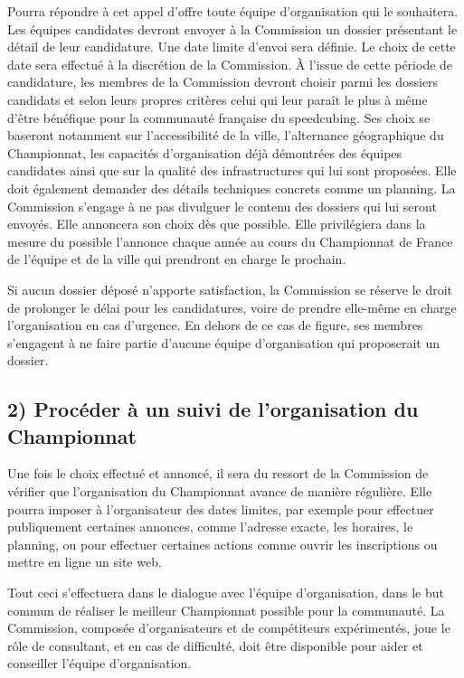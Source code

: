 \documentclass[a4paper,12pt]{scrartcl}
\begin{document}
Pourra répondre à cet appel d'offre toute équipe d'organisation qui le souhaitera. Les équipes candidates devront envoyer à la Commission un dossier présentant le détail de leur candidature. Une date limite d'envoi sera définie. Le choix de cette date sera effectué à la discrétion de la Commission. À l'issue de cette période de candidature, les membres de la Commission devront choisir parmi les dossiers candidats et selon leurs propres critères celui qui leur paraît le plus à même d'être bénéfique pour la communauté française du speedcubing. Ses choix se baseront notamment sur l'accessibilité de la ville, l'alternance géographique du Championnat, les capacités d'organisation déjà démontrées des équipes candidates ainsi que sur la qualité des infrastructures qui lui sont proposées. Elle doit également demander des détails techniques concrets comme un planning. La Commission s'engage à ne pas divulguer le contenu des dossiers qui lui seront envoyés. Elle annoncera son choix dès que possible. Elle privilégiera dans la mesure du possible l'annonce chaque année au cours du Championnat de France de l'équipe et de la ville qui prendront en charge le prochain.

Si aucun dossier déposé n'apporte satisfaction, la Commission se réserve le droit de prolonger le délai pour les candidatures, voire de prendre elle-même en charge l'organisation en cas d'urgence. En dehors de ce cas de figure, ses membres s'engagent à ne faire partie d'aucune équipe d'organisation qui proposerait un dossier.

\subsection*{2) Procéder à un suivi de l'organisation du Championnat}
Une fois le choix effectué et annoncé, il sera du ressort de la Commission de vérifier que l'organisation du Championnat avance de manière régulière. Elle pourra imposer à l'organisateur des dates limites, par exemple pour effectuer publiquement certaines annonces, comme l'adresse exacte, les horaires, le planning, ou pour effectuer certaines actions comme ouvrir les inscriptions ou mettre en ligne un site web.

Tout ceci s'effectuera dans le dialogue avec l'équipe d'organisation, dans le but commun de réaliser le meilleur Championnat possible pour la communauté. La Commission, composée d'organisateurs et de compétiteurs expérimentés, joue le rôle de consultant, et en cas de difficulté, doit être disponible pour aider et conseiller l'équipe d'organisation.
\end{document}
